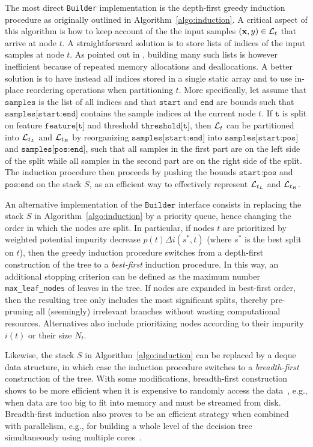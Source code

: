 The most direct \texttt{Builder} implementation is the depth-first greedy
induction procedure as originally outlined in Algorithm~\ref{algo:induction}. A
critical aspect of this algorithm is how to keep account of the  the input
samples $(\mathbf{x},y) \in {\cal L}_t$  that arrive at node $t$. A
straightforward solution is to store lists of indices of the input samples at
node $t$. As pointed out in \citep{criminisi:2013}, building many such lists is
however inefficient because of repeated memory allocations and deallocations. A
better solution is to have instead all indices stored in a single static array
and to use in-place reordering operations when partitioning $t$. More
specifically, let assume that  $\texttt{samples}$ is the list of all indices
and that  $\texttt{start}$ and $\texttt{end}$ are bounds such that
$\texttt{samples[start:end]}$ contains the sample indices at the current node
$t$. If $\texttt{t}$ is split on feature $\texttt{feature[t]}$ and threshold
$\texttt{threshold[t]}$, then ${\cal L}_t$ can be partitioned into ${\cal
L}_{t_L}$ and ${\cal L}_{t_R}$ by reorganizing $\texttt{samples[start:end]}$
into $\texttt{samples[start:pos]}$ and $\texttt{samples[pos:end]}$, such that
all samples in the first part are on the left side of the split while all
samples in the second part are on the right side of the split. The induction
procedure then proceeds by pushing the bounds $\texttt{start:pos}$ and
$\texttt{pos:end}$ on the stack $S$, as an efficient way to effectively
represent ${\cal L}_{t_L}$ and ${\cal L}_{t_R}$.

An alternative implementation of the $\texttt{Builder}$ interface consists in
replacing the stack $S$ in Algorithm~\ref{algo:induction} by a priority queue,
hence changing the order in which the nodes are split. In particular, if nodes
$t$ are prioritized by weighted potential impurity decrease $p(t) \Delta
i(s^*,t)$ (where $s^*$ is the best split on $t$), then the greedy induction
procedure switches from a depth-first construction of the tree to a \textit
{best-first} induction procedure. In this way, an additional stopping criterion
can be defined as the maximum number \texttt{max\_leaf\_nodes} of leaves in the
tree. If nodes are expanded in best-first order, then the resulting tree only
includes the most significant splits, thereby pre-pruning all (seemingly)
irrelevant branches without wasting computational resources. Alternatives also
include prioritizing nodes according to their impurity $i(t)$ or their size $N_t$.

Likewise,  the stack $S$ in Algorithm~\ref{algo:induction} can be replaced by a
deque data structure, in which case the induction procedure switches to a
\textit{breadth-first} construction of the tree. With some modifications,
breadth-first construction shows to be more efficient when it is expensive to
randomly access the data~\citep{criminisi:2013}, e.g., when data are too big to
fit into memory and must be streamed from disk. Breadth-first induction also
proves to be an efficient strategy when combined with parallelism, e.g., for
building a whole level of the decision tree simultaneously using multiple
cores~\citep{liao:2013}.

